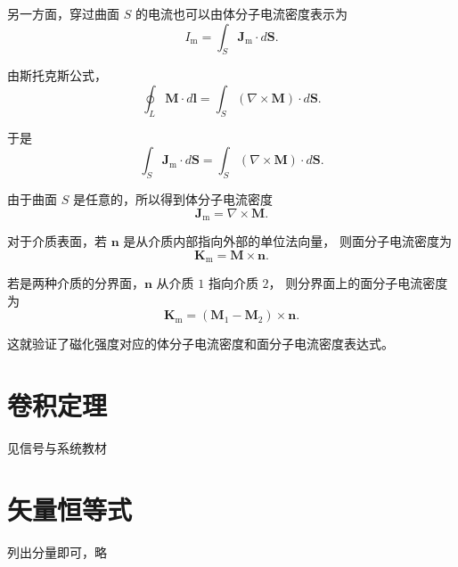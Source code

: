 \documentclass{article}
\begin{document}
另一方面，穿过曲面 $S$ 的电流也可以由体分子电流密度表示为
\begin{equation}
    I_{\mathrm{m}}
    =
    \int_S \mathbf{J}_{\mathrm{m}}\cdot d\mathbf{S}.
\end{equation}

由斯托克斯公式，
\begin{equation}
    \oint_L \mathbf{M}\cdot d\mathbf{l}
    =
    \int_S
    \left(
    \nabla\times \mathbf{M}
    \right)
    \cdot d\mathbf{S}.
\end{equation}

于是
\begin{equation}
    \int_S \mathbf{J}_{\mathrm{m}}\cdot d\mathbf{S}
    =
    \int_S
    \left(
    \nabla\times \mathbf{M}
    \right)
    \cdot d\mathbf{S}.
\end{equation}

由于曲面 $S$ 是任意的，所以得到体分子电流密度
\begin{equation}
    \mathbf{J}_{\mathrm{m}}
    =
    \nabla\times \mathbf{M}.
\end{equation}

对于介质表面，若 $\mathbf{n}$ 是从介质内部指向外部的单位法向量，
则面分子电流密度为
\begin{equation}
    \mathbf{K}_{\mathrm{m}}
    =
    \mathbf{M}\times \mathbf{n}.
\end{equation}

若是两种介质的分界面，$\mathbf{n}$ 从介质 $1$ 指向介质 $2$，
则分界面上的面分子电流密度为
\begin{equation}
    \mathbf{K}_{\mathrm{m}}
    =
    \left(
    \mathbf{M}_1-\mathbf{M}_2
    \right)
    \times \mathbf{n}.
\end{equation}

这就验证了磁化强度对应的体分子电流密度和面分子电流密度表达式。
\section{卷积定理}见信号与系统教材
\section{矢量恒等式}
列出分量即可，略
\end{document}
